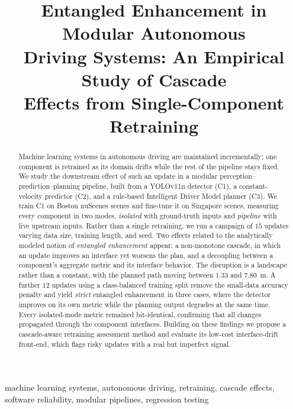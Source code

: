 \documentclass[conference]{IEEEtran}
\title{Entangled Enhancement in Modular Autonomous\\
Driving Systems: An Empirical Study of Cascade\\
Effects from Single-Component Retraining}
\author{\IEEEauthorblockN{Rashedul Arefin Ifty, Fumio Machida}
\IEEEauthorblockA{University of Tsukuba\\
Tsukuba, Japan\\
ifty.rashedul@sd.cs.tsukuba.ac.jp, machida@cs.tsukuba.ac.jp}}
\begin{document}
\maketitle
{}%

\begin{abstract}
Machine learning systems in autonomous driving are maintained incrementally: one
component is retrained as its domain drifts while the rest of the pipeline stays
fixed. We study the downstream effect of such an update in a modular
perception--prediction--planning pipeline, built from a YOLOv11n detector (C1), a
constant-velocity predictor (C2), and a rule-based Intelligent Driver Model
planner (C3). We train C1 on Boston nuScenes scenes and fine-tune it on Singapore
scenes, measuring every component in two modes, \emph{isolated} with
ground-truth inputs and \emph{pipeline} with live upstream inputs. Rather than a
single retraining, we run a campaign of $15$ updates varying data size, training
length, and seed. Two effects related to the analytically modeled notion of
\emph{entangled enhancement} appear: a non-monotone cascade, in which an update
improves an interface yet worsens the plan, and a decoupling between a
component's aggregate metric and its interface behavior. The disruption is a
landscape rather than a constant, with the planned path moving between $1.33$ and
$7.80$~m. A further $12$ updates using a class-balanced training split remove the
small-data accuracy penalty and yield \emph{strict} entangled enhancement in
three cases, where the detector improves on its own metric while the planning
output degrades at the same time. Every isolated-mode metric remained
bit-identical, confirming that all changes propagated through the component
interfaces. Building on these findings we propose a cascade-aware retraining
assessment method and evaluate its low-cost interface-drift front-end, which
flags risky updates with a real but imperfect signal.
\end{abstract}

\begin{IEEEkeywords}
machine learning systems, autonomous driving, retraining, cascade effects,
software reliability, modular pipelines, regression testing
\end{IEEEkeywords}

\end{document}
